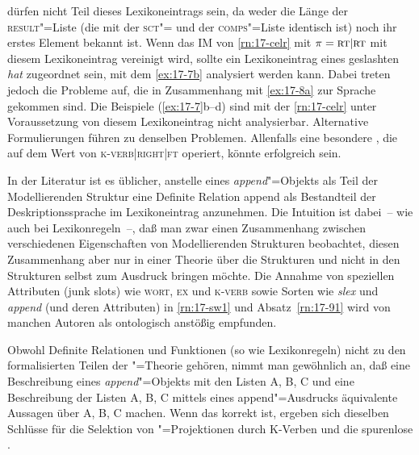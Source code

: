 \documentclass[output=paper]{LSP/langsci}
\begin{document}
dürfen nicht Teil dieses Lexikoneintrags sein, da weder die Länge der
\textsc{result}"=Liste (die mit der \textsc{sct}"= und der \textsc{comps}"=Liste identisch ist) noch ihr erstes Element bekannt ist. Wenn das IM von \eqref{rn:17-celr} mit $\pi = \textsc{rt|rt}$ mit diesem Lexikoneintrag vereinigt wird, sollte ein Lexikoneintrag eines geslashten \textit{hat} zugeordnet sein, mit dem \eqref{ex:17-7b} analysiert werden kann. Dabei treten jedoch die Probleme auf, die in Zusammenhang mit \eqref{ex:17-8a} zur Sprache gekommen sind. Die Beispiele (\ref{ex:17-7}b--d) sind mit der \eqref{rn:17-celr} unter Voraussetzung von diesem Lexikoneintrag nicht analysierbar. Alternative Formulierungen führen zu denselben Problemen. Allenfalls eine besondere , die auf dem Wert von \textsc{k-verb|right|ft} operiert, könnte erfolgreich sein.

\randnum\label{rn:17-93}In der Literatur ist es üblicher, anstelle eines \textit{append}"=Objekts als Teil der Modellierenden Struktur eine Definite Relation \textsf{append} als Bestandteil der Deskriptionssprache im Lexikoneintrag anzunehmen. Die Intuition ist dabei~-- wie auch bei Lexikonregeln~--, daß man zwar einen Zusammenhang zwischen verschiedenen Eigenschaften von Modellierenden Strukturen beobachtet, diesen Zusammenhang aber nur in einer Theorie über die Strukturen und nicht in den Strukturen selbst zum Ausdruck bringen möchte. Die Annahme von speziellen Attributen ({\glqq}junk slots{\grqq}) wie \textsc{wort}, \textsc{ex} und \textsc{k-verb} sowie Sorten wie \textit{slex} und \textit{append} (und deren Attributen) \zb in \eqref{rn:17-sw1} und Absatz~\ref{rn:17-91} wird von manchen Autoren als ontologisch anstößig empfunden.

\randnum\label{rn:17-94}Obwohl Definite Relationen und Funktionen (so wie
Lexikonregeln) nicht zu den formalisierten Teilen der
"=Theorie gehören, nimmt man gewöhnlich an, daß eine
Beschreibung eines \textit{append}"=Objekts mit den Listen A, B, C und
eine Beschreibung der Listen A, B, C mittels eines
\textsf{append}"=Ausdrucks äquivalente Aussagen über A, B, C
machen. Wenn das korrekt ist, ergeben sich dieselben Schlüsse für die
Selektion von "=Projektionen durch K-Verben und die spurenlose
.

\printbibliography[heading=subbibliography,notkeyword=this]
\label{chap-spurenlose-extraktion-end}
\end{document}

